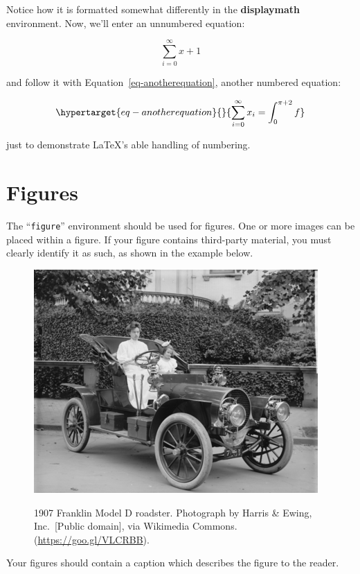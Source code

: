 \documentclass[manuscript,screen]{acmart}
\begin{document}
Notice how it is formatted somewhat differently in the
\textbf{displaymath} environment. Now, we'll enter an unnumbered
equation:

\[\sum_{i=0}^{\infty} x + 1\]

and follow it with Equation~\ref{eq-anotherequation}, another numbered
equation:

\begin{equation}\protect\hypertarget{eq-anotherequation}{}{
\sum_{i=0}^{\infty}x_i=\int_{0}^{\pi+2} f
}\label{eq-anotherequation}\end{equation}

just to demonstrate \LaTeX's able handling of numbering.

\hypertarget{figures}{%
\section{Figures}\label{figures}}

The ``\texttt{figure}'' environment should be used for figures. One or
more images can be placed within a figure. If your figure contains
third-party material, you must clearly identify it as such, as shown in
the example below.

\begin{figure}
{\centering \includegraphics{sample-franklin.png}}
\caption{1907 Franklin Model D roadster. Photograph by Harris \& Ewing,
Inc.~{[}Public domain{]}, via Wikimedia Commons.
(\url{https://goo.gl/VLCRBB}).}
\end{figure}

Your figures should contain a caption which describes the figure to the
reader.
\end{document}
